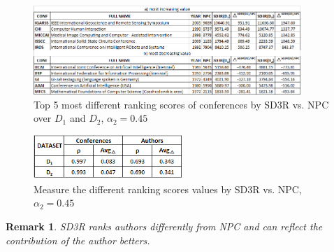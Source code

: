 \documentclass[10pt,leqno,twoside]{article}
\newtheorem{remark}{\indent Remark}[section]
\begin{document}
%
\begin{figure} %
	\caption{Top 5 most different ranking scores of conferences by SD3R vs. NPC over $D_1$ and $D_2$, $\alpha_2=0.45$}
	\label{Fig:Top5Inc}
    \centering
    \includegraphics[width=0.9\textwidth]{Top5cInc}
\end{figure}
%
%
\begin{figure} 
	\caption{Measure the different ranking scores values by SD3R vs. NPC, $\alpha_2=0.45$}
	\label{Fig:DeltaRho}
    \centering
    \includegraphics[width=0.5\textwidth]{delta_rho}
\end{figure}
%

\begin{remark}
SD3R ranks authors differently from NPC and can reflect the contribution of the author betters.
\end{remark}
\end{document}
